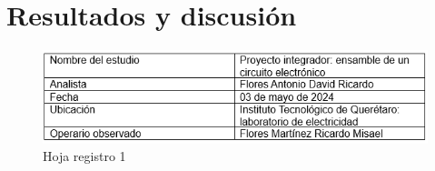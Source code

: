 %
%



% 
% 

\section{Resultados y discusión}

\begin{figure}[H]
    \centering
    \includegraphics[scale=0.4]{10/Img/hojaRegistro1.png}
    \caption{Hoja registro 1}
    \label{fig:hojaRegistro1.png}
\end{figure}

